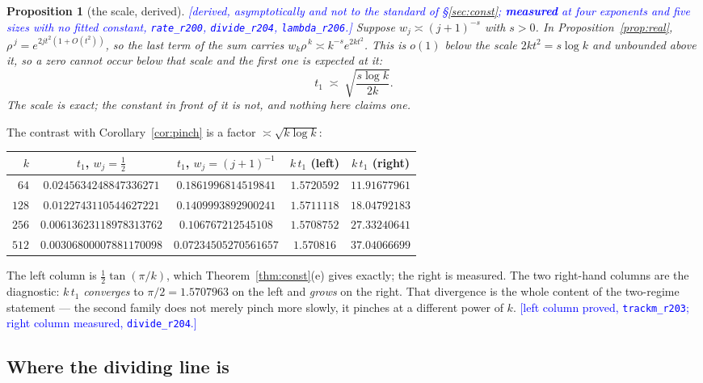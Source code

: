 \documentclass[11pt,a4paper]{article}
\theoremstyle{plain}
\newtheorem{proposition}[theorem]{Proposition}
\theoremstyle{definition}
\theoremstyle{remark}
\newcommand{\STATUS}[1]{\textcolor{blue}{\textsf{[#1]}}}
\begin{document}
\begin{proposition}[the scale, derived]\label{prop:scale}
\STATUS{derived, asymptotically and not to the standard of \S\ref{sec:const};
\textbf{measured} at four exponents and five sizes with no fitted constant,
\texttt{rate\_r200}, \texttt{divide\_r204}, \texttt{lambda\_r206}.}
Suppose $w_j\asymp(j+1)^{-s}$ with $s>0$. In Proposition~\ref{prop:real},
$\rho^{\,j}=e^{2jt^{2}(1+O(t^{2}))}$, so the last term of the sum carries
$w_k\rho^{\,k}\asymp k^{-s}e^{2kt^{2}}$. This is $o(1)$ below the scale
$2kt^{2}=s\log k$ and unbounded above it, so a zero cannot occur below that scale and
the first one is expected at it:
\[
  t_1\;\asymp\;\sqrt{\frac{s\log k}{2k}} .
\]
\emph{The scale is exact; the constant in front of it is not, and nothing here claims
one.}
\end{proposition}

The contrast with Corollary~\ref{cor:pinch} is a factor $\asymp\sqrt{k\log k}$:

\begin{center}
\begin{tabular}{rcccc}
\toprule
$k$ & $t_1$, $w_j=\tfrac12$ & $t_1$, $w_j=(j+1)^{-1}$ & $k\,t_1$ (left) & $k\,t_1$ (right)\\
\midrule
$64$   & $0.0245634248847336271$  & $0.1861996814519841$  & $1.5720592$ & $11.91677961$\\
$128$  & $0.0122743110544627221$  & $0.1409993892900241$  & $1.5711118$ & $18.04792183$\\
$256$  & $0.00613623118978313762$ & $0.106767212545108$   & $1.5708752$ & $27.33240641$\\
$512$  & $0.00306800007881170098$ & $0.07234505270561657$ & $1.570816$  & $37.04066699$\\
\bottomrule
\end{tabular}
\end{center}

\noindent
The left column is $\tfrac12\tan(\pi/k)$, which Theorem~\ref{thm:const}(e) gives exactly;
the right is measured. The two right-hand columns are the diagnostic: $k\,t_1$
\emph{converges} to $\pi/2=1.5707963$ on the left and \emph{grows} on the right. That
divergence is the whole content of the two-regime statement --- the second family does
not merely pinch more slowly, it pinches at a different power of $k$.
\STATUS{left column proved, \texttt{trackm\_r203}; right column measured,
\texttt{divide\_r204}.}

\subsection{Where the dividing line is}\label{sec:line}
\end{document}
